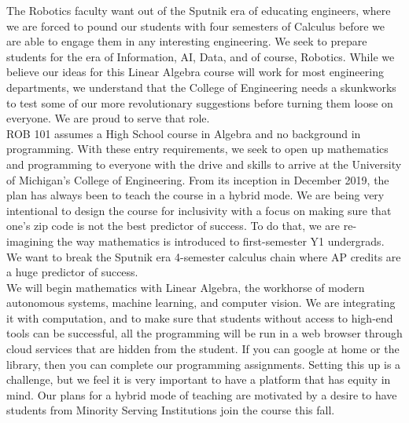 The Robotics faculty want out of the Sputnik era of educating engineers, where we are forced to pound our students with four semesters of Calculus before we are able to engage them in any interesting engineering. We seek to prepare students for the era of Information, AI, Data, and of course, Robotics. While we believe our ideas for this Linear Algebra course will work for most engineering departments, we understand that the College of Engineering needs a skunkworks to test some of our more revolutionary suggestions before turning them loose on everyone. We are proud to serve that role.\\


ROB 101 assumes a High School course in Algebra and no background in programming. With these entry requirements, we seek to open up mathematics and programming to everyone with the drive and skills to arrive at the University of Michigan's College of Engineering. From its inception in December 2019, the plan has always been to teach the course in a hybrid mode. We are being very intentional to design the course for inclusivity with a focus on making sure that one's zip code is not the best predictor of success. To do that, we are re-imagining the way mathematics is introduced to first-semester Y1 undergrads. We want to break the Sputnik era 4-semester calculus chain where AP credits are a huge predictor of success.\\

We will begin mathematics with Linear Algebra, the workhorse of modern autonomous systems, machine learning, and computer vision. We are integrating it with computation, and to make sure that students without access to high-end tools can be successful, all the programming will be run in a web browser through cloud services that are hidden from the student. If you can google at home or the library, then you can complete our programming assignments. Setting this up is a challenge, but we feel it is very important to have a platform that has equity in mind. Our plans for a hybrid mode of teaching are motivated by a desire to have students from Minority Serving Institutions join the course this fall.\\

